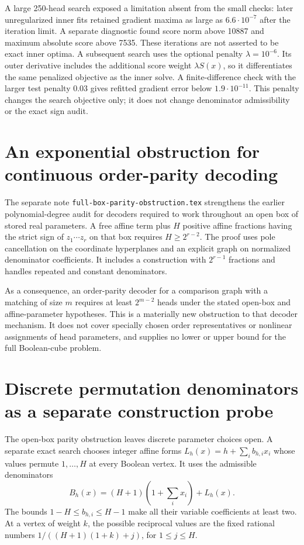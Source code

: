 \documentclass[11pt]{article}
\begin{document}
A large 250-head search exposed a limitation absent from the small
checks: later unregularized inner fits retained gradient maxima as large
as $6.6\cdot10^{-7}$ after the iteration limit. A separate diagnostic
found score norm above 10887 and maximum absolute score above 7535.
These iterations are not asserted to be exact inner optima. A subsequent
search uses the optional penalty $\lambda=10^{-6}$. Its outer derivative
includes the additional score weight $\lambda S(x)$, so it differentiates
the same penalized objective as the inner solve. A finite-difference
check with the larger test penalty $0.03$ gives refitted gradient error
below $1.9\cdot10^{-11}$. This penalty changes the search objective only;
it does not change denominator admissibility or the exact sign audit.


\section{An exponential obstruction for continuous order-parity decoding}

The separate note \texttt{full-box-parity-obstruction.tex} strengthens
the earlier polynomial-degree audit for decoders required to work
throughout an open box of stored real parameters. A free affine term
plus $H$ positive affine fractions having the strict sign of
$z_1\cdots z_r$ on that box requires $H\ge2^{r-2}$. The proof uses
pole cancellation on the coordinate hyperplanes and an explicit graph
on normalized denominator coefficients. It includes a construction with
$2^{r-1}$ fractions and handles repeated and constant denominators.

As a consequence, an order-parity decoder for a comparison graph with
a matching of size $m$ requires at least $2^{m-2}$ heads under the
stated open-box and affine-parameter hypotheses. This is a materially
new obstruction to that decoder mechanism. It does not cover specially
chosen order representatives or nonlinear assignments of head parameters,
and supplies no lower or upper bound for the full Boolean-cube problem.


\section{Discrete permutation denominators as a separate construction probe}

The open-box parity obstruction leaves discrete parameter choices open.
A separate exact search chooses integer affine forms
$L_h(x)=h+\sum_i b_{h,i}x_i$ whose values permute $1,\ldots,H$ at
every Boolean vertex. It uses the admissible denominators
\[
 B_h(x)=(H+1)(1+\sum_i x_i)+L_h(x).
\]
The bounds $1-H\le b_{h,i}\le H-1$ make all their variable
coefficients at least two. At a vertex of weight $k$, the possible
reciprocal values are the fixed rational numbers
$1/((H+1)(1+k)+j)$, for $1\le j\le H$.
\end{document}
